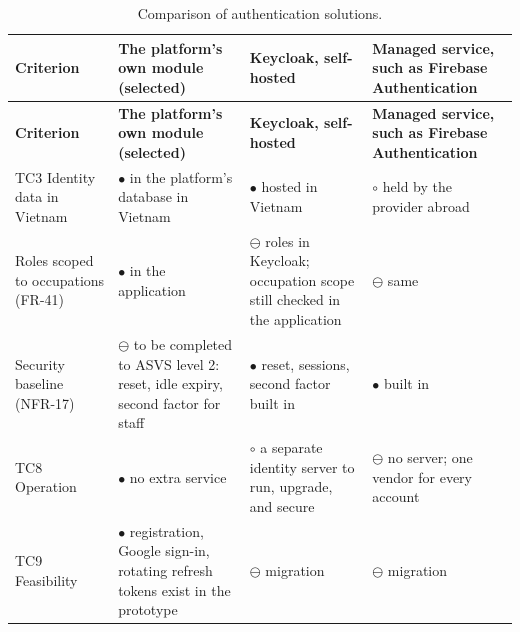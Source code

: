 {\small{}\renewcommand{\arraystretch}{1.1}
\begin{longtable}{|>{\raggedright\arraybackslash}p{}|>{\raggedright\arraybackslash}p{}|>{\raggedright\arraybackslash}p{}|>{\raggedright\arraybackslash}p{}|}
\caption{Comparison of authentication solutions.} \\
\hline
\textbf{Criterion} & \textbf{The platform's own module (selected)} & \textbf{Keycloak, self-hosted\cite{r186}} & \textbf{Managed service, such as Firebase Authentication\cite{r187}} \\ \hline
\endfirsthead
\hline
\textbf{Criterion} & \textbf{The platform's own module (selected)} & \textbf{Keycloak, self-hosted\cite{r186}} & \textbf{Managed service, such as Firebase Authentication\cite{r187}} \\ \hline
\endhead
TC3 Identity data in Vietnam & $\bullet$ in the platform's database in Vietnam & $\bullet$ hosted in Vietnam & $\circ$ held by the provider abroad \\ \hline
Roles scoped to occupations (FR-41) & $\bullet$ in the application & $\ominus$ roles in Keycloak; occupation scope still checked in the application & $\ominus$ same \\ \hline
Security baseline (NFR-17) & $\ominus$ to be completed to ASVS level 2\cite{r157}: reset, idle expiry, second factor for staff & $\bullet$ reset, sessions, second factor built in & $\bullet$ built in \\ \hline
TC8 Operation & $\bullet$ no extra service & $\circ$ a separate identity server to run, upgrade, and secure & $\ominus$ no server; one vendor for every account \\ \hline
TC9 Feasibility & $\bullet$ registration, Google sign-in, rotating refresh tokens exist in the prototype & $\ominus$ migration & $\ominus$ migration \\ \hline
\end{longtable}
}

